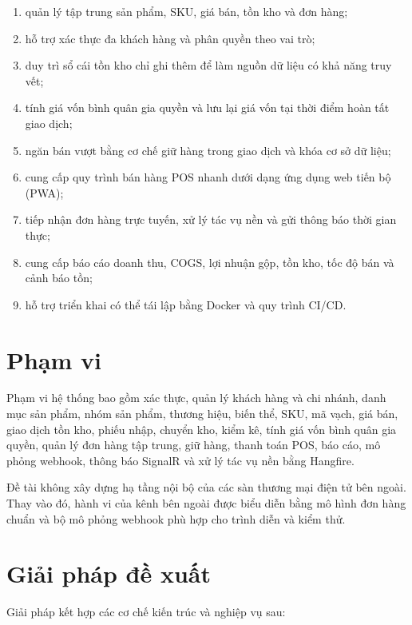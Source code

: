 \begin{enumerate}
    \item quản lý tập trung sản phẩm, SKU, giá bán, tồn kho và đơn hàng;
    \item hỗ trợ xác thực đa khách hàng và phân quyền theo vai trò;
    \item duy trì sổ cái tồn kho chỉ ghi thêm để làm nguồn dữ liệu có khả năng truy vết;
    \item tính giá vốn bình quân gia quyền và lưu lại giá vốn tại thời điểm hoàn tất giao dịch;
    \item ngăn bán vượt bằng cơ chế giữ hàng trong giao dịch và khóa cơ sở dữ liệu;
    \item cung cấp quy trình bán hàng POS nhanh dưới dạng ứng dụng web tiến bộ (PWA);
    \item tiếp nhận đơn hàng trực tuyến, xử lý tác vụ nền và gửi thông báo thời gian thực;
    \item cung cấp báo cáo doanh thu, COGS, lợi nhuận gộp, tồn kho, tốc độ bán và cảnh báo tồn;
    \item hỗ trợ triển khai có thể tái lập bằng Docker và quy trình CI/CD.
\end{enumerate}

\section{Phạm vi}

Phạm vi hệ thống bao gồm xác thực, quản lý khách hàng và chi nhánh, danh mục sản phẩm,
nhóm sản phẩm, thương hiệu, biến thể, SKU, mã vạch, giá bán, giao dịch tồn kho, phiếu nhập,
chuyển kho, kiểm kê, tính giá vốn bình quân gia quyền, quản lý đơn hàng tập trung, giữ hàng,
thanh toán POS, báo cáo, mô phỏng webhook, thông báo SignalR và xử lý tác vụ nền bằng Hangfire.

Đề tài không xây dựng hạ tầng nội bộ của các sàn thương mại điện tử bên ngoài. Thay vào đó,
hành vi của kênh bên ngoài được biểu diễn bằng mô hình đơn hàng chuẩn và bộ mô phỏng webhook
phù hợp cho trình diễn và kiểm thử.

\section{Giải pháp đề xuất}

Giải pháp kết hợp các cơ chế kiến trúc và nghiệp vụ sau:

